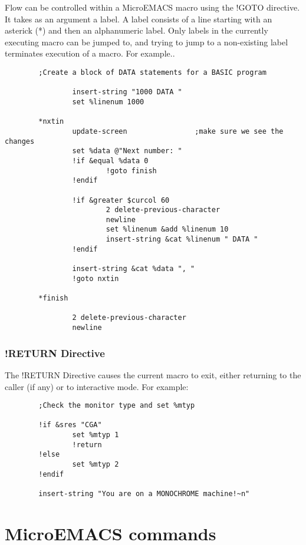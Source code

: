 Flow can be controlled within a MicroEMACS macro using the !GOTO
directive. It takes as an argument a label. A label consists of a line
starting with an asterick (*) and then an alphanumeric label.  Only
labels in the currently executing macro can be jumped to, and trying to
jump to a non-existing label terminates execution of a macro.  For
example..

\begin{verbatim}
        ;Create a block of DATA statements for a BASIC program

                insert-string "1000 DATA "
                set %linenum 1000

        *nxtin
                update-screen                ;make sure we see the changes
                set %data @"Next number: "
                !if &equal %data 0
                        !goto finish
                !endif

                !if &greater $curcol 60
                        2 delete-previous-character
                        newline
                        set %linenum &add %linenum 10
                        insert-string &cat %linenum " DATA "
                !endif

                insert-string &cat %data ", "
                !goto nxtin

        *finish

                2 delete-previous-character
                newline
\end{verbatim}

\subsection{!RETURN Directive}

The !RETURN Directive causes the current macro to exit, either
returning to the caller (if any) or to interactive mode.  For example:

\begin{verbatim}
        ;Check the monitor type and set %mtyp

        !if &sres "CGA"
                set %mtyp 1
                !return
        !else
                set %mtyp 2
        !endif

        insert-string "You are on a MONOCHROME machine!~n"
\end{verbatim}
\appendix
\chapter{MicroEMACS commands}

